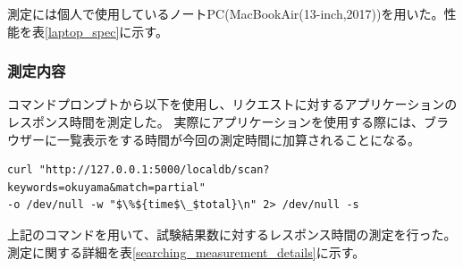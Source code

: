 測定には個人で使用しているノートPC(MacBookAir(13-inch,2017))を用いた。性能を表\ref{laptop_spec}に示す。

\begin{table}[tbp]
\caption[ノートPCの性能]{ノートPCの性能}
\label{laptop_spec}
\end{table}


\subsubsection{測定内容}

コマンドプロンプトから以下を使用し、リクエストに対するアプリケーションのレスポンス時間を測定した。
実際にアプリケーションを使用する際には、ブラウザーに一覧表示をする時間が今回の測定時間に加算されることになる。

\begin{lstlisting}
curl "http://127.0.0.1:5000/localdb/scan?keywords=okuyama&match=partial" 
-o /dev/null -w "$\%${time$\_$total}\n" 2> /dev/null -s
\end{lstlisting}

上記のコマンドを用いて、試験結果数に対するレスポンス時間の測定を行った。
測定に関する詳細を表\ref{searching_measurement_details}に示す。

\begin{table}[tbp]
\begin{center}
\caption[検索機能処理時間測定の詳細]{検索機能処理時間測定の詳細}
\label{searching_measurement_details}
\end{center}
\end{table}


